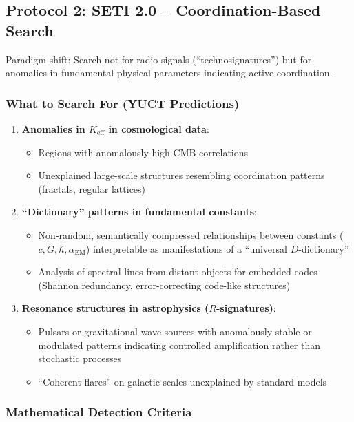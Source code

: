 \documentclass[12pt,a4paper]{article}
\newcommand{\eff}{\mathrm{eff}}
\newcommand{\Ke}{K_{\eff}}
\begin{document}
	\subsection{Protocol 2: SETI 2.0 -- Coordination-Based Search}
	
	Paradigm shift: Search not for radio signals (``technosignatures'') but for anomalies in fundamental physical parameters indicating active coordination.
	
	\subsubsection{What to Search For (YUCT Predictions)}
	
	\begin{enumerate}
		\item \textbf{Anomalies in \(\Ke\) in cosmological data}:
		\begin{itemize}
			\item Regions with anomalously high CMB correlations
			\item Unexplained large-scale structures resembling coordination patterns (fractals, regular lattices)
		\end{itemize}
		
		\item \textbf{``Dictionary'' patterns in fundamental constants}:
		\begin{itemize}
			\item Non-random, semantically compressed relationships between constants (\(c, G, \hbar, \alpha_{\mathrm{EM}}\)) interpretable as manifestations of a ``universal \(D\)-dictionary''
			\item Analysis of spectral lines from distant objects for embedded codes (Shannon redundancy, error-correcting code-like structures)
		\end{itemize}
		
		\item \textbf{Resonance structures in astrophysics (\(R\)-signatures)}:
		\begin{itemize}
			\item Pulsars or gravitational wave sources with anomalously stable or modulated patterns indicating controlled amplification rather than stochastic processes
			\item ``Coherent flares'' on galactic scales unexplained by standard models
		\end{itemize}
	\end{enumerate}
	
	\subsubsection{Mathematical Detection Criteria}
	
\end{document}
